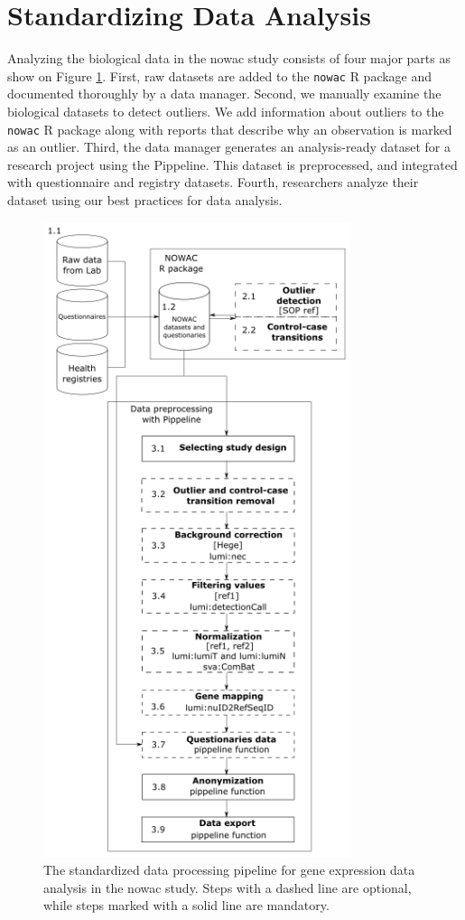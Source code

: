 \section{Standardizing Data Analysis}
Analyzing the biological data in the \gls{nowac} study consists of four major
parts as show on Figure \ref{fig:uit_pippeline}.  First, raw datasets are added
to the \texttt{nowac} R package and documented thoroughly by a data manager.
Second, we manually examine the biological datasets to detect outliers. We add
information about outliers to the \texttt{nowac} R package along with reports
that describe why an observation is marked as an outlier.  Third, the data
manager generates an analysis-ready dataset for a research project using the
Pippeline. This dataset is preprocessed, and integrated with questionnaire and
registry datasets. Fourth, researchers analyze their dataset using our best
practices for data analysis.

\begin{figure}
    \centering
    \includegraphics[width=9cm]{figures/uit_pippeline.png}
    \caption{The standardized data processing pipeline for gene expression data
    analysis in the \gls{nowac} study. Steps with a dashed line are optional,
    while steps marked with a solid line are mandatory.}
    \label{fig:uit_pippeline}
\end{figure}



